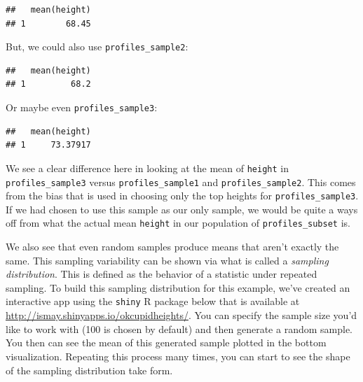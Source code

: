 \documentclass[]{tufte-book}
\newenvironment{Shaded}{\begin{snugshade}}{\end{snugshade}}
\newcommand{\KeywordTok}[1]{\textcolor[rgb]{0.13,0.29,0.53}{\textbf{{#1}}}}
\newcommand{\StringTok}[1]{\textcolor[rgb]{0.31,0.60,0.02}{{#1}}}
\newcommand{\NormalTok}[1]{{#1}}
\begin{document}
\begin{Shaded}
\end{Shaded}

\begin{verbatim}
##   mean(height)
## 1        68.45
\end{verbatim}

But, we could also use \texttt{profiles\_sample2}:

\begin{Shaded}
\end{Shaded}

\begin{verbatim}
##   mean(height)
## 1         68.2
\end{verbatim}

Or maybe even \texttt{profiles\_sample3}:

\begin{Shaded}
\end{Shaded}

\begin{verbatim}
##   mean(height)
## 1     73.37917
\end{verbatim}

We see a clear difference here in looking at the mean of \texttt{height}
in \texttt{profiles\_sample3} versus \texttt{profiles\_sample1} and
\texttt{profiles\_sample2}. This comes from the bias that is used in
choosing only the top heights for \texttt{profiles\_sample3}. If we had
chosen to use this sample as our only sample, we would be quite a ways
off from what the actual mean \texttt{height} in our population of
\texttt{profiles\_subset} is.

We also see that even random samples produce means that aren't exactly
the same. This sampling variability can be shown via what is called a
\emph{sampling distribution}. This is defined as the behavior of a
statistic under repeated sampling. To build this sampling distribution
for this example, we've created an interactive app using the
\texttt{shiny} R package below that is available at
\url{http://ismay.shinyapps.io/okcupidheights/}. You can specify the
sample size you'd like to work with (100 is chosen by default) and then
generate a random sample. You then can see the mean of this generated
sample plotted in the bottom visualization. Repeating this process many
times, you can start to see the shape of the sampling distribution take
form.
\end{document}
